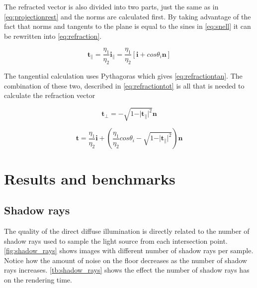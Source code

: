 \documentclass[a4paper, 12pt]{report}
\begin{document}
The refracted vector is also divided into two parts, just the same as in \autoref{eq:projectionrest} and the norms are calculated first. 
By taking advantage of the fact that norms and tangents to the plane is equal to the sines in \autoref{eq:snell} it can be rewritten into \autoref{eq:refraction}.

\begin{equation} \label{eq:refraction}
\mathbf{t}_\| = \frac{\eta_1}{\eta_2} \mathbf{i}_\| = \frac{\eta_1}{\eta_2} 
[\mathbf{i} + cos \theta_i \mathbf{n}]
\end{equation}

The tangential calculation uses Pythagoras which gives \autoref{eq:refractiontan}. 
The combination of these two, described in \autoref{eq:refractiontot} is all that is needed to calculate the refraction vector 

\begin{equation} \label{eq:refractiontan}
\mathbf{t}_\bot = - \sqrt{1 - \vert \mathbf{t}_\| \vert ^2}\mathbf{n}
\end{equation}

\begin{equation} \label{eq:refractiontot}
\mathbf{t} = \frac{\eta_1}{\eta_2} \mathbf{i} + (\frac{\eta_1}{\eta_2} cos \theta_i - \sqrt{1 - \vert \mathbf{t}_\| \vert ^2})\mathbf{n}
\end{equation}

\chapter{Results and benchmarks} \label{ch:results}

\section{Shadow rays}
The quality of the direct diffuse illumination is directly related to the number of shadow rays used to sample the light source from each intersection point. 
\autoref{fig:shadow_rays} shows images with different number of shadow rays per sample. 
Notice how the amount of noise on the floor decreases as the number of shadow rays increases. \autoref{tb:shadow_rays} shows the effect the number of shadow rays has on the rendering time.
\end{document}
